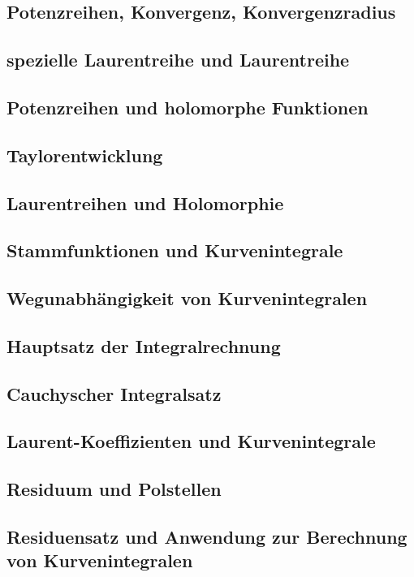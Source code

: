 \subsection{Potenzreihen, Konvergenz, Konvergenzradius}
\subsection{spezielle Laurentreihe und Laurentreihe}
\subsection{Potenzreihen und holomorphe Funktionen}
\subsection{Taylorentwicklung}
\subsection{Laurentreihen und Holomorphie}
\subsection{Stammfunktionen und Kurvenintegrale}
\subsection{Wegunabhängigkeit von Kurvenintegralen}
\subsection{Hauptsatz der Integralrechnung}
\subsection{Cauchyscher Integralsatz}
\subsection{Laurent-Koeffizienten und Kurvenintegrale}
\subsection{Residuum und Polstellen}
\subsection{Residuensatz und Anwendung zur Berechnung von Kurvenintegralen}